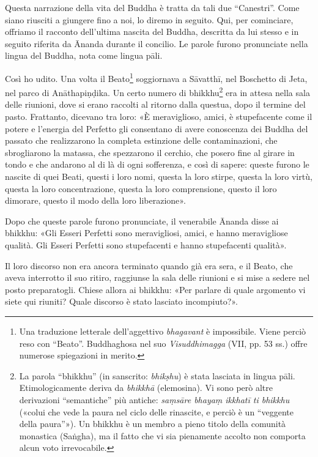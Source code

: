  Questa narrazione della vita del Buddha è tratta da
tali due “Canestri”. Come siano riusciti a giungere fino a noi, lo diremo in
seguito. Qui, per cominciare, offriamo il racconto dell’ultima nascita del
Buddha, descritta da lui stesso e in seguito riferita da Ānanda durante il
concilio. Le parole furono pronunciate nella lingua del Buddha, nota come lingua
pāli.

 Così ho udito. Una volta il Beato\footnote{Una traduzione
  letterale dell’aggettivo \emph{bhagavant} è impossibile. Viene perciò reso con
  “Beato”. Buddhaghosa nel suo \emph{Visuddhimagga} (VII, pp. 53 ss.) offre
  numerose spiegazioni in merito.} soggiornava a Sāvatthī, nel Boschetto di
Jeta, nel parco di Anāthapiṇḍika. Un certo numero di bhikkhu\footnote{La parola
  “bhikkhu” (in sanscrito: \emph{bhikṣhu}) è stata lasciata in lingua pāli.
  Etimologicamente deriva da \emph{bhikkhā} (elemosina). Vi sono però altre
  derivazioni “semantiche” più antiche: \emph{saṃsāre bhayaṃ ikkhatī ti bhikkhu}
  («colui che vede la paura nel ciclo delle rinascite, e perciò è un “veggente
  della paura”»). Un bhikkhu è un membro a pieno titolo della comunità monastica
  (Saṅgha), ma il fatto che vi sia pienamente accolto non comporta alcun voto
  irrevocabile.} era in attesa nella sala delle riunioni, dove si erano raccolti
al ritorno dalla questua, dopo il termine del pasto. Frattanto, dicevano tra
loro: «È meraviglioso, amici, è stupefacente come il potere e l’energia del
Perfetto gli consentano di avere conoscenza dei Buddha del passato che
realizzarono la completa estinzione delle contaminazioni, che sbrogliarono la
matassa, che spezzarono il cerchio, che posero fine al girare in tondo e che
andarono al di là di ogni sofferenza, e così di sapere: queste furono le nascite
di quei Beati, questi i loro nomi, questa la loro stirpe, questa la loro virtù,
questa la loro concentrazione, questa la loro comprensione, questo il loro
dimorare, questo il modo della loro liberazione».

Dopo che queste parole furono pronunciate, il venerabile Ānanda disse ai
bhikkhu: «Gli Esseri Perfetti sono meravigliosi, amici, e hanno meravigliose
qualità. Gli Esseri Perfetti sono stupefacenti e hanno stupefacenti qualità».

Il loro discorso non era ancora terminato quando già era sera, e il Beato, che
aveva interrotto il suo ritiro, raggiunse la sala delle riunioni e si mise a
sedere nel posto preparatogli. Chiese allora ai bhikkhu: «Per parlare di quale
argomento vi siete qui riuniti? Quale discorso è stato lasciato incompiuto?».

